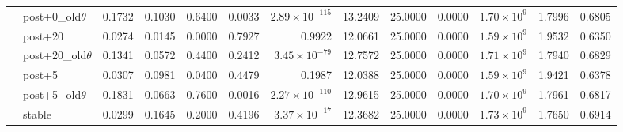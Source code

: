 {\begin{longtable}{@{}llrrrrrrrrrrr@{}}
 & post+0\_old$\theta$ & 0.1732 & 0.1030 & 0.6400 & 0.0033 & $2.89\times 10^{-115}$ & 13.2409 & 25.0000 & 0.0000 & $1.70\times 10^{9}$ & 1.7996 & 0.6805 \\
 & post+20 & 0.0274 & 0.0145 & 0.0000 & 0.7927 & 0.9922 & 12.0661 & 25.0000 & 0.0000 & $1.59\times 10^{9}$ & 1.9532 & 0.6350 \\
 & post+20\_old$\theta$ & 0.1341 & 0.0572 & 0.4400 & 0.2412 & $3.45\times 10^{-79}$ & 12.7572 & 25.0000 & 0.0000 & $1.71\times 10^{9}$ & 1.7940 & 0.6829 \\
 & post+5 & 0.0307 & 0.0981 & 0.0400 & 0.4479 & 0.1987 & 12.0388 & 25.0000 & 0.0000 & $1.59\times 10^{9}$ & 1.9421 & 0.6378 \\
 & post+5\_old$\theta$ & 0.1831 & 0.0663 & 0.7600 & 0.0016 & $2.27\times 10^{-110}$ & 12.9615 & 25.0000 & 0.0000 & $1.70\times 10^{9}$ & 1.7961 & 0.6817 \\
 & stable & 0.0299 & 0.1645 & 0.2000 & 0.4196 & $3.37\times 10^{-17}$ & 12.3682 & 25.0000 & 0.0000 & $1.73\times 10^{9}$ & 1.7650 & 0.6914 \\
\end{longtable}
}
